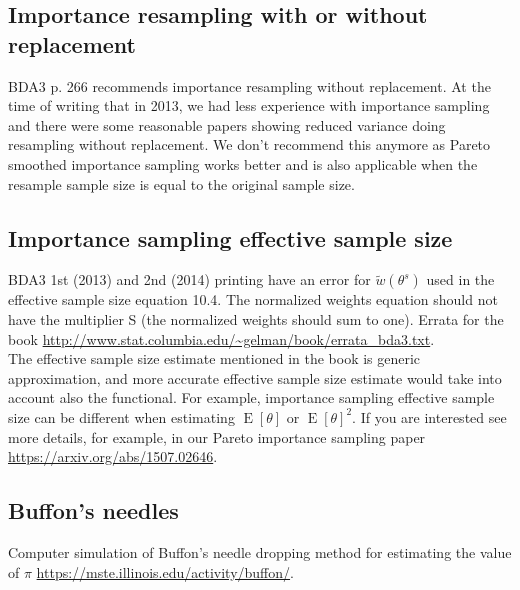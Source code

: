 \documentclass[a4paper,11pt,english]{article}
\DeclareMathOperator{\E}{E}
\begin{document}
 \subsection*{Importance resampling with or without replacement}

 BDA3 p. 266 recommends importance resampling without replacement. At
 the time of writing that in 2013, we had less experience with
 importance sampling and there were some reasonable papers showing
 reduced variance doing resampling without replacement. We don't
 recommend this anymore as Pareto smoothed importance sampling works
 better and is also applicable when the resample sample size is equal
 to the original sample size.
 
 \subsection*{Importance sampling effective sample size}
 
 {\color{red} BDA3 1st (2013) and 2nd (2014) printing have an error
   for $\tilde{w}(\theta^s)$ used in the effective sample size
   equation 10.4. The normalized weights equation should not have the
   multiplier S (the normalized weights should sum to one). Errata for
   the book
   \url{http://www.stat.columbia.edu/~gelman/book/errata_bda3.txt}.}\\

 The effective sample size estimate mentioned in the book is generic approximation, and more accurate effective sample size estimate would take into account also the functional. For example, importance sampling effective sample size can be different when estimating $\E[\theta]$ or $\E[\theta]^2$. If you are interested see more details, for example, in our Pareto importance sampling paper \url{https://arxiv.org/abs/1507.02646}.
 
 \subsection*{Buffon's needles}

 Computer simulation of Buffon's needle dropping method for estimating
 the value of $\pi$ \url{https://mste.illinois.edu/activity/buffon/}. 

 
\end{document}
